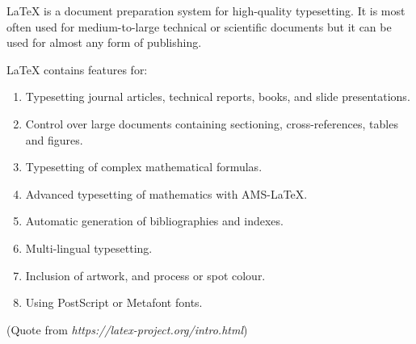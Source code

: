 \begin{eabstract}
	LaTeX is a document preparation system for high-quality typesetting. It is most often used for medium-to-large technical or scientific documents but it can be used for almost any form of publishing.
	
  LaTeX contains features for:
\begin{enumerate}
  	\item Typesetting journal articles, technical reports, books, and slide presentations.
  	\item Control over large documents containing sectioning, cross-references, tables and figures.
  	\item Typesetting of complex mathematical formulas.
  	\item Advanced typesetting of mathematics with AMS-LaTeX.
  	\item Automatic generation of bibliographies and indexes.
  	\item Multi-lingual typesetting.
  	\item Inclusion of artwork, and process or spot colour.
  	\item Using PostScript or Metafont fonts.
  \end{enumerate}
  (Quote from \textit{https://latex-project.org/intro.html})  
\end{eabstract}

